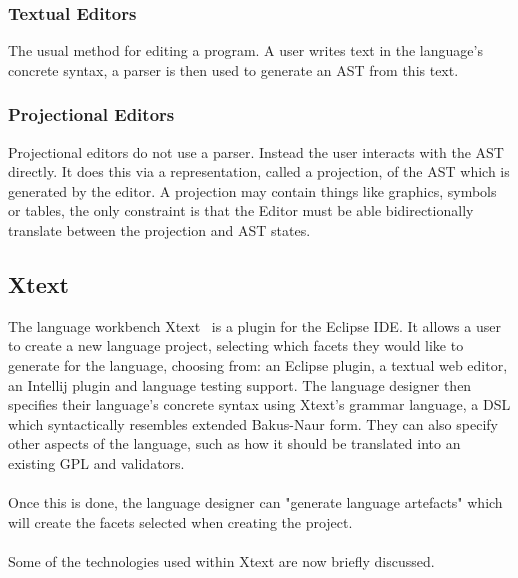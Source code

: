 \documentclass{article}
\begin{document}
\subsubsection{Textual Editors}
The usual method for editing a program. A user writes text in the language's concrete syntax, a parser is then used to generate an AST from this text.
\subsubsection{Projectional Editors}
Projectional editors do not use a parser. Instead the user interacts with the AST directly. It does this via a representation, called a projection, of the AST which is generated by the editor. A projection may contain things like graphics, symbols or tables, the only constraint is that the Editor must be able bidirectionally translate between the projection and AST states. 

\subsection{Xtext}\label{xtext}
The language workbench Xtext~\cite{xtext} is a plugin for the Eclipse IDE. It allows a user to create a new language project, selecting which facets they would like to generate for the language, choosing from: an Eclipse plugin, a textual web editor, an Intellij plugin and language testing support. The language designer then specifies their language's concrete syntax using Xtext's grammar language, a DSL which syntactically resembles extended Bakus-Naur form. They can also specify other aspects of the language, such as how it should be translated into an existing GPL and validators.
\\
\\
Once this is done, the language designer can "generate language artefacts" which will create the facets selected when creating the project. 
\\
\\
Some of the technologies used within Xtext are now briefly discussed.
\end{document}
